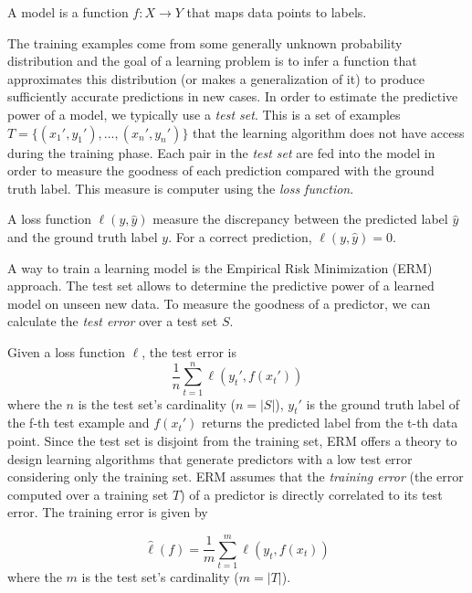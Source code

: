 \begin{definition}[Model]
	A model is a function $f:X \to Y$ that maps data points to labels.
\end{definition}

The training examples come from some generally unknown probability distribution and the goal of a learning problem is to infer a function that approximates this distribution (or makes a generalization of it) to produce sufficiently accurate predictions in new cases. In order to estimate the predictive power of a model, we typically use a \textit{test set}. This is a set of examples $T=\{(x_1', y_1'), ..., (x_n', y_n')\}$ that the learning algorithm does not have access during the training phase. Each pair in the \textit{test set} are fed into the model in order to measure the goodness of each prediction compared with the ground truth label. This measure is computer using the \textit{loss function}.

\begin{definition}
	A loss function $\ell(y, \hat y)$ measure the discrepancy between the predicted label $\hat y$ and the ground truth label $y$. For a correct prediction, $\ell (y, \hat y) = 0$.
\end{definition}

A way to train a learning model is the Empirical Risk Minimization (ERM) approach. The test set allows to determine the predictive power of a learned model on unseen new data. To measure the goodness of a predictor, we can calculate the \textit{test error} over a test set $S$. 

Given a loss function $\ell$, the test error is
\begin{equation}
\frac{1}{n} \sum_{t=1}^{n}\ell(y_t', f(x_t'))
\end{equation}
where the $n$ is the test set's cardinality ($n = |S|$), $y_t'$ is the ground truth label of the f-th test example and $f(x_t')$ returns the predicted label from the t-th data point. Since the test set is disjoint from the training set, ERM offers a theory to design learning algorithms that generate predictors with a low test error considering only the training set. ERM assumes that the \textit{training error} (the error computed over a training set $T$) of a predictor is directly correlated to its test error. The training error is given by 

\begin{equation}
\hat \ell(f) = \frac{1}{m} \sum_{t=1}^{m}\ell(y_t, f(x_t))
\end{equation}
where the $m$ is the test set's cardinality ($m = |T|$).



